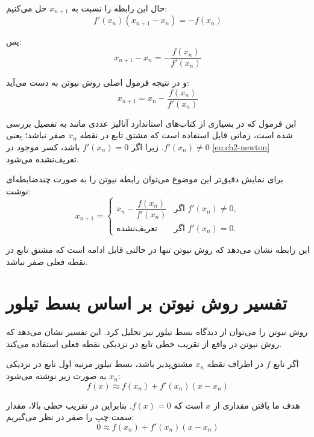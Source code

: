 حال این رابطه را نسبت به $x_{n+1}$ حل می‌کنیم:
\[
f'(x_n)(x_{n+1}-x_n)=-f(x_n)
\]

پس:
\begin{equation}
x_{n+1}-x_n=-\frac{f(x_n)}{f'(x_n)}
\label{eq:ch2-newton-step}
\end{equation}

و در نتیجه فرمول اصلی روش نیوتن به دست می‌آید:
\begin{equation}
x_{n+1}=x_n-\frac{f(x_n)}{f'(x_n)}
\label{eq:ch2-newton}
\end{equation}

این فرمول که در بسیاری از کتاب‌های استاندارد آنالیز عددی مانند \cite{burden2010numerical} به تفصیل بررسی شده است، زمانی قابل استفاده است که مشتق تابع در نقطه $x_n$ صفر نباشد؛ یعنی $f'(x_n)\neq 0$. زیرا اگر $f'(x_n)=0$ باشد، کسر موجود در \eqref{eq:ch2-newton} تعریف‌نشده می‌شود.

برای نمایش دقیق‌تر این موضوع می‌توان رابطه نیوتن را به صورت چندضابطه‌ای نوشت:
\begin{equation}
x_{n+1}=
\begin{cases}
x_n-\dfrac{f(x_n)}{f'(x_n)} & \text{اگر } f'(x_n)\neq 0,\\[8pt]
\text{تعریف‌نشده} & \text{اگر } f'(x_n)=0.
\end{cases}
\label{eq:ch2-newton-piecewise}
\end{equation}

این رابطه نشان می‌دهد که روش نیوتن تنها در حالتی قابل ادامه است که مشتق تابع در نقطه فعلی صفر نباشد.

\section{تفسیر روش نیوتن بر اساس بسط تیلور}

روش نیوتن را می‌توان از دیدگاه بسط تیلور نیز تحلیل کرد. این تفسیر نشان می‌دهد که روش نیوتن در واقع از تقریب خطی تابع در نزدیکی نقطه فعلی استفاده می‌کند.

اگر تابع $f$ در اطراف نقطه $x_n$ مشتق‌پذیر باشد، بسط تیلور مرتبه اول تابع در نزدیکی $x_n$ به صورت زیر نوشته می‌شود:
\begin{equation}
f(x)\approx f(x_n)+f'(x_n)(x-x_n)
\label{eq:ch2-taylor1}
\end{equation}

هدف ما یافتن مقداری از $x$ است که $f(x)=0$. بنابراین در تقریب خطی بالا، مقدار سمت چپ را صفر در نظر می‌گیریم:
\begin{equation}
0\approx f(x_n)+f'(x_n)(x-x_n)
\label{eq:ch2-taylor1-zero}
\end{equation}

